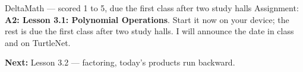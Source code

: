 \documentclass[aspectratio=169, 11pt]{beamer}
\begin{document}
\begin{frame}[t, plain]
  \begin{block}{DeltaMath --- scored 1 to 5, due the first class after two study halls}
    Assignment: \textbf{A2: Lesson 3.1: Polynomial Operations}. Start it now on your device; the
    rest is due the first class after two study halls. I will announce the date in class and on
    TurtleNet.
  \end{block}
  \vspace{6pt}
  \textbf{Next:} Lesson 3.2 --- factoring, today's products run backward.
\end{frame}
\end{document}
